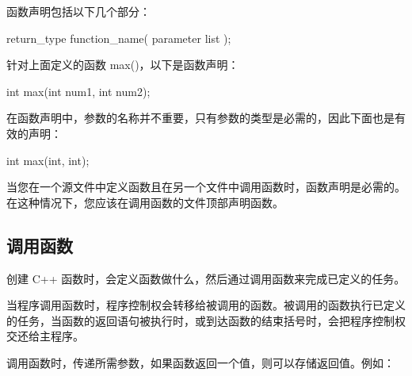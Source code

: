 \documentclass[
]{article}
\newenvironment{Shaded}{}{}
\newcommand{\DataTypeTok}[1]{\textcolor[rgb]{0.56,0.13,0.00}{#1}}
\newcommand{\NormalTok}[1]{#1}
\newcommand{\OperatorTok}[1]{\textcolor[rgb]{0.40,0.40,0.40}{#1}}
\begin{document}
函数声明包括以下几个部分：

\begin{Shaded}
\begin{Highlighting}[]
\DataTypeTok{return\_type}\NormalTok{ function\_name}\OperatorTok{(}\NormalTok{ parameter list }\OperatorTok{);}
\end{Highlighting}
\end{Shaded}

针对上面定义的函数 max()，以下是函数声明：

\begin{Shaded}
\begin{Highlighting}[]
\DataTypeTok{int}\NormalTok{ max}\OperatorTok{(}\DataTypeTok{int}\NormalTok{ num1}\OperatorTok{,} \DataTypeTok{int}\NormalTok{ num2}\OperatorTok{);}
\end{Highlighting}
\end{Shaded}

在函数声明中，参数的名称并不重要，只有参数的类型是必需的，因此下面也是有效的声明：

\begin{Shaded}
\begin{Highlighting}[]
\DataTypeTok{int}\NormalTok{ max}\OperatorTok{(}\DataTypeTok{int}\OperatorTok{,} \DataTypeTok{int}\OperatorTok{);}
\end{Highlighting}
\end{Shaded}

当您在一个源文件中定义函数且在另一个文件中调用函数时，函数声明是必需的。在这种情况下，您应该在调用函数的文件顶部声明函数。

\hypertarget{ux8c03ux7528ux51fdux6570}{%
\subsection{调用函数}\label{ux8c03ux7528ux51fdux6570}}

创建 C++ 函数时，会定义函数做什么，然后通过调用函数来完成已定义的任务。

当程序调用函数时，程序控制权会转移给被调用的函数。被调用的函数执行已定义的任务，当函数的返回语句被执行时，或到达函数的结束括号时，会把程序控制权交还给主程序。

调用函数时，传递所需参数，如果函数返回一个值，则可以存储返回值。例如：
\end{document}
